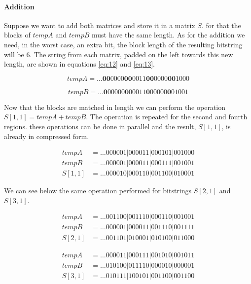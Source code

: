 \documentclass[12pt]{article}
\begin{document}
\paragraph{Addition}

Suppose we want to add both matrices and store it in a matrix $S$. for that the
blocks of $tempA$ and $tempB$ must have the same length. As for the addition we
need, in the worst case, an extra bit, the block length of the resulting
bitstring will be 6. The string from each matrix, padded on the left towards
this new length,  are shown in equations \ref{eq:12} and \ref{eq:13}.

\begin{equation}\label{eq:12}
tempA =  \ldots\textbf{00}0000\textbf{00}0011\textbf{00}0000\textbf{00}1000
\end{equation}

\begin{equation}\label{eq:13}
tempB =  \ldots\textbf{0}00000\textbf{0}00011\textbf{0}00000\textbf{0}01001
\end{equation}

Now that the blocks are matched in length we can perform the operation $S[1,1] =
tempA + tempB$. The operation is repeated for the second and fourth regions.
these operations can be done in parallel and the result, $S[1,1]$, is already
in compressed form.

\begin{align*}
 tempA&= \ldots000001|000011|000101|001000\\
 tempB&= \ldots000001|000011|000111|001001\\
 S[1,1]&=\ldots000010|000110|001100|010001
\end{align*}

We can see below the same operation performed for bitstrings $S[2,1]$ and
$S[3,1]$.

\begin{align*}
 tempA&= \ldots001100|001110|000110|001001\\
 tempB&= \ldots000001|000011|001110|001111\\
 S[2,1]&=\ldots001101|010001|010100|011000
\end{align*}

\begin{align*}
 tempA&= \ldots000011|000111|001010|001011 \\
 tempB&= \ldots010100|011110|000010|000001 \\
 S[3,1]&=\ldots010111|100101|001100|001100
\end{align*}
\end{document}
